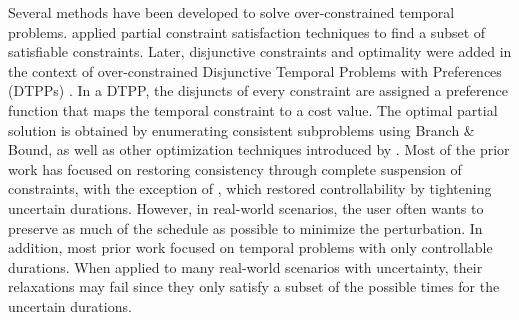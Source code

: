 \documentclass[jair,twoside,11pt,theapa]{article}
\begin{document}
Several methods have been developed to solve over-constrained temporal problems.
 applied partial constraint satisfaction techniques
to find a subset of satisfiable constraints. Later, disjunctive constraints and
optimality were added in the context of over-constrained Disjunctive Temporal
Problems with Preferences (DTPPs) \cite{Peintner_Pref_2005}. In a DTPP, the
disjuncts of every constraint are assigned a preference function that maps the
temporal constraint to a cost value. The optimal partial solution is obtained by
enumerating consistent subproblems using Branch \& Bound, as well as other
optimization techniques introduced by . Most
of the prior work has focused on restoring consistency through complete
suspension of constraints, with the exception of \cite{lanz2015simple}, which
restored controllability by tightening uncertain durations. However, in
real-world scenarios, the user often wants to preserve as much of the schedule
as possible to minimize the perturbation. In addition, most prior work focused on
temporal problems with only controllable durations. When applied to many
real-world scenarios with uncertainty, their relaxations may fail since they
only satisfy a subset of the possible times for the uncertain durations.


%
%
%
%
%
%
%
\end{document}
